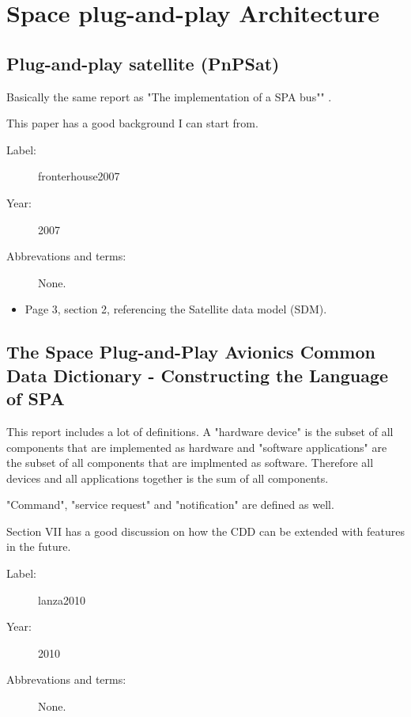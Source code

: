 \chapter{Space plug-and-play Architecture}


\section{Plug-and-play satellite (PnPSat)}
Basically the same report as "The implementation of a SPA bus""
\cite{martin2008}.

This paper has a good background I can start from.

\begin{description}
    \item[Label:] fronterhouse2007 \cite{fronterhouse2007}
    \item[Year:] 2007
    \item[Abbrevations and terms:] None.
\end{description}

\begin{itemize}
    \item Page 3, section 2, referencing the Satellite data model (SDM).
\end{itemize}

\section{The Space Plug-and-Play Avionics Common Data Dictionary - Constructing
the Language of SPA}

This report includes a lot of definitions. A "hardware device" is the subset of
all components that are implemented as hardware and "software applications" are
the subset of all components that are implmented as software. Therefore all
devices and all applications together is the sum of all components.

"Command", "service request" and "notification" are defined as well.

Section VII has a good discussion on how the CDD can be extended with features
in the future.

\begin{description}
    \item[Label:] lanza2010 \cite{lanza2010}
    \item[Year:] 2010
    \item[Abbrevations and terms:] None.
\end{description}

